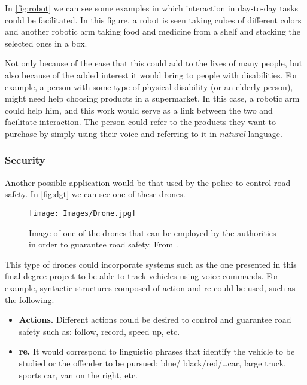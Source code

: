 In \vref{fig:robot} we can see some examples in which interaction in day-to-day
tasks could be facilitated. In this figure, a robot is seen taking cubes of
different colors and another robotic arm taking food and medicine from a shelf
and stacking the selected ones in a box.

Not only because of the ease that this could add to the lives of many people,
but also because of the added interest it would bring to people with
disabilities. For example, a person with some type of physical disability (or
an elderly person), might need help choosing products in a supermarket. In this
case, a robotic arm could help him, and this work would serve as a link between
the two and facilitate interaction. The person could refer to the products they
want to purchase by simply using their voice and referring to it in
\emph{natural} language.

\subsubsection{Security}

Another possible application would be that used by the police to control road
safety. In \vref{fig:dgt} we can see one of these drones.

\begin{figure}[ht]
  \centering
  \texttt{[image: Images/Drone.jpg]}
  \caption[Drones employed for road safety]{Image of one of the drones that can
    be employed by the authorities in order to guarantee road safety. From
    .}\label{fig:dgt}
\end{figure}

This type of drones could incorporate systems such as the one presented in this
final degree project to be able to track vehicles using voice commands. For
example, syntactic structures composed of action and \gls{re} could be used,
such as the following.

\begin{itemize}
  \item \textbf{Actions.} Different actions could be desired to control and
  guarantee road safety such as: follow, record, speed up, etc.
  \item \textbf{\gls{re}.} It would correspond to linguistic phrases that
  identify the vehicle to be studied or the offender to be pursued: blue/
  black/red/\ldots car, large truck, sports car, van on the right, etc.
\end{itemize}


